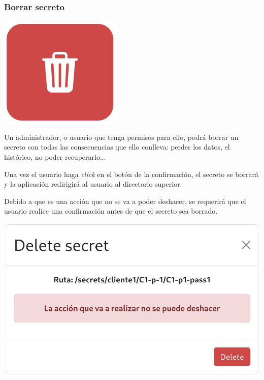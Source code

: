 \documentclass{\ClassPath/viu-tfm-template}
\begin{document}
\subsubsection*{Borrar secreto}
{
\begin{minipage}{0.1\linewidth}
    \includegraphics[width=\linewidth]{img/delete.png}
\end{minipage}
\hspace{0.5cm}
\begin{minipage}{0.9\linewidth}
    Un administrador, o usuario que tenga permisos para ello, podrá borrar un secreto con todas las consecuencias que ello conlleva: perder los datos, el histórico, no poder recuperarlo...
\end{minipage}

Una vez el usuario haga \textit{click} en el botón de la confirmación, el secreto se borrará y la aplicación redirigirá al usuario al directorio superior.
}

Debido a que es una acción que no se va a poder deshacer, se requerirá que el usuario realice una confirmación antes de que el secreto sea borrado.

\begin{center}
    \includegraphics[width=0.6\linewidth]{img/delete_warning.png}
\end{center}
\end{document}
